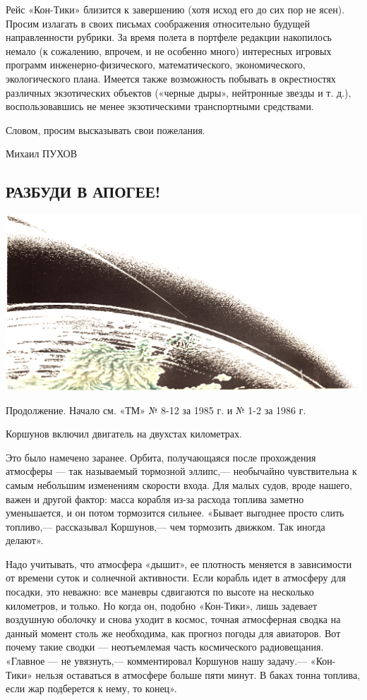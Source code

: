 \documentclass[11pt,a4paper,oneside]{article}
\begin{document}
Рейс «Кон-Тики» близится к завершению (хотя исход его до сих пор не ясен). Просим излагать в своих письмах соображения относительно будущей направленности рубрики. За время полета в портфеле редакции накопилось немало (к сожалению, впрочем, и не особенно много) интересных игровых программ инженерно-физического, математического, экономического, экологического плана. Имеется также возможность побывать в окрестностях различных экзотических объектов («черные дыры», нейтронные звезды и т. д.), воспользовавшись не менее экзотическими транспортными средствами.

Словом, просим высказывать свои пожелания.

Михаил ПУХОВ

\subsection{РАЗБУДИ В АПОГЕЕ!}
\includegraphics[width=\textwidth]{apogee1}

Продолжение. Начало см. «ТМ» № 8-12 за 1985 г. и № 1-2 за 1986 г.

Коршунов включил двигатель на двухстах километрах.

Это было намечено заранее. Орбита, получающаяся после прохождения атмосферы — так называемый тормозной эллипс,— необычайно чувствительна к самым небольшим изменениям скорости входа. Для малых судов, вроде нашего, важен и другой фактор: масса корабля из-за расхода топлива заметно уменьшается, и он потом тормозится сильнее. «Бывает выгоднее просто слить топливо,— рассказывал	Коршунов,— чем тормозить движком. Так иногда делают».

Надо учитывать, что атмосфера «дышит», ее плотность меняется в зависимости от времени суток и солнечной активности. Если корабль идет в атмосферу для посадки, это неважно: все маневры сдвигаются по высоте на несколько километров, и только. Но когда он, подобно «Кон-Тики», лишь задевает воздушную оболочку и снова уходит в космос, точная атмосферная сводка на данный момент столь же необходима, как прогноз погоды для авиаторов. Вот почему такие сводки — неотъемлемая часть космического радиовещания. «Главное — не увязнуть,— комментировал Коршунов нашу задачу.— «Кон-Тики» нельзя оставаться в атмосфере больше пяти минут. В баках тонна топлива, если жар подберется к нему, то конец».
\end{document}
